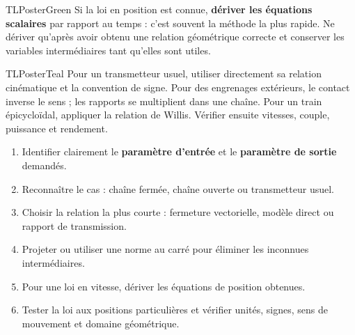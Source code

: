 \documentclass[10pt,a3paper]{article}
\begin{document}
\begin{minipage}[t]{0.49\linewidth}
\begin{TLPosterBloc}{TLPosterGreen}
Si la loi en position est connue, \textbf{dériver les équations scalaires} par rapport au temps : c'est souvent la méthode la plus rapide. Ne dériver qu'après avoir obtenu une relation géométrique correcte et conserver les variables intermédiaires tant qu'elles sont utiles.
\end{TLPosterBloc}
\begin{TLPosterBloc}{TLPosterTeal}
Pour un transmetteur usuel, utiliser directement sa relation cinématique et la convention de signe. Pour des engrenages extérieurs, le contact inverse le sens ; les rapports se multiplient dans une chaîne. Pour un train épicycloïdal, appliquer la relation de Willis. Vérifier ensuite vitesses, couple, puissance et rendement.
\end{TLPosterBloc}
\end{minipage}
\vfill
\begin{TLPosterMethode}
\begin{enumerate}
  \item Identifier clairement le \textbf{paramètre d'entrée} et le \textbf{paramètre de sortie} demandés.
  \item Reconnaître le cas : chaîne fermée, chaîne ouverte ou transmetteur usuel.
  \item Choisir la relation la plus courte : fermeture vectorielle, modèle direct ou rapport de transmission.
  \item Projeter ou utiliser une norme au carré pour éliminer les inconnues intermédiaires.
  \item Pour une loi en vitesse, dériver les équations de position obtenues.
  \item Tester la loi aux positions particulières et vérifier unités, signes, sens de mouvement et domaine géométrique.
\end{enumerate}
\end{TLPosterMethode}
\vfill
{}
\end{document}
